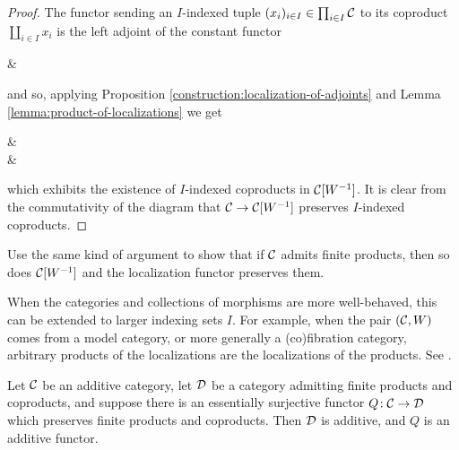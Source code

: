 \begin{proof}
The functor sending an \(I\)-indexed tuple \((x_i)_{i\in I}\in\prod_{i\in I}\mathcal{C}\) to its coproduct \(\coprod_{i\in I}x_i\) is the left adjoint of the constant functor
\begin{diagram*}
	\calC\ar[from=r,bend right,shift right,"\coprod_{i\in I}-"',""{name=A,below}] &  \ar[from=l,"\Delta"',""{name=B,above}]\ar[from=A,to=B,symbol=\dashv]
\end{diagram*}
and so, applying Proposition \ref{construction:localization-of-adjoints} and Lemma \ref{lemma:product-of-localizations} we get
\begin{diagram*}[column sep=large]
	\calC\ar[from=r,bend right,shift right,"\coprod_{i\in I}-"',""{name=A,below}]\ar[d] &  \ar[from=l,"\Delta"',""{name=B,above}]\ar[from=A,to=B,symbol=\dashv]\ar[d] \\
	\mathmakebox[\widthof{\calC}][r]{\calC[W^{-1}]}\ar[from=r,bend right,shift right,dashed,""{name=C,below}] &  \ar[from=l,"\Delta"',""{name=D,above}]\ar[from=C,to=D,symbol=\dashv]
\end{diagram*}
which exhibits the existence of \(I\)-indexed coproducts in \(\mathcal{C}[W^{-1}]\). It is clear from the commutativity of the diagram that \(\mathcal{C}\to\mathcal{C}[W^{-1}]\) preserves \(I\)-indexed coproducts.
\end{proof}
\begin{exercise}\label{exercise:localization-admits-products}
	Use the same kind of argument to show that if \(\mathcal{C}\) admits finite products, then so does \(\mathcal{C}[W^{-1}]\) and the localization functor preserves them.
\end{exercise}
\begin{remark}
	When the categories and collections of morphisms are more well-behaved, this can be extended to larger indexing sets \(I\). For example, when the pair \((\mathcal{C},W)\) comes from
	a model category, or more generally a (co)fibration category, arbitrary products of the localizations are the localizations of the products. See \cite[Thm.\ 7.1.1]{radulescubanu2009cofibrationshomotopytheory}.
\end{remark}
\begin{lemma}\label{lemma:induced-additive-structure}
	Let \(\mathcal{C}\) be an additive category, let \(\mathcal{D}\) be a category admitting finite products and coproducts, and suppose there is an essentially surjective
	functor \(Q\!:\mathcal{C}\to\mathcal{D}\) which preserves finite products and coproducts. Then \(\mathcal{D}\) is additive, and \(Q\) is an additive functor.
\end{lemma}
